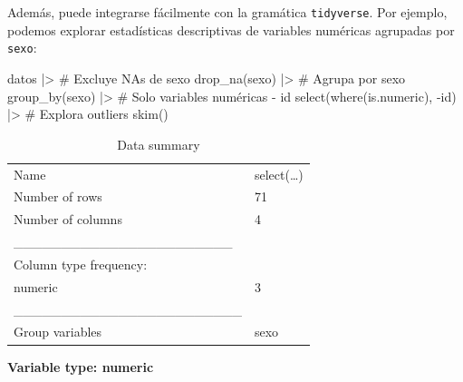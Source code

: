 \documentclass[
  spanish,
  letterpaper,
  DIV=11,
  numbers=noendperiod]{scrreprt}
\newenvironment{Shaded}{\begin{snugshade}}{\end{snugshade}}
\newcommand{\CommentTok}[1]{\textcolor[rgb]{0.37,0.37,0.37}{#1}}
\newcommand{\FunctionTok}[1]{\textcolor[rgb]{0.28,0.35,0.67}{#1}}
\newcommand{\NormalTok}[1]{\textcolor[rgb]{0.00,0.23,0.31}{#1}}
\newcommand{\SpecialCharTok}[1]{\textcolor[rgb]{0.37,0.37,0.37}{#1}}
\begin{document}
Además, puede integrarse fácilmente con la gramática \texttt{tidyverse}.
Por ejemplo, podemos explorar estadísticas descriptivas de variables
numéricas agrupadas por \texttt{sexo}:

\begin{Shaded}
\begin{Highlighting}[]
\NormalTok{datos }\SpecialCharTok{|\textgreater{}}
  \CommentTok{\# Excluye NAs de sexo}
  \FunctionTok{drop\_na}\NormalTok{(sexo) }\SpecialCharTok{|\textgreater{}}
  \CommentTok{\# Agrupa por sexo}
  \FunctionTok{group\_by}\NormalTok{(sexo) }\SpecialCharTok{|\textgreater{}}
  \CommentTok{\# Solo variables numéricas {-} id}
  \FunctionTok{select}\NormalTok{(}\FunctionTok{where}\NormalTok{(is.numeric), }\SpecialCharTok{{-}}\NormalTok{id) }\SpecialCharTok{|\textgreater{}}
  \CommentTok{\# Explora outliers}
  \FunctionTok{skim}\NormalTok{()}
\end{Highlighting}
\end{Shaded}

\begin{longtable}[]{@{}ll@{}}
\caption{Data summary}\tabularnewline
\toprule\noalign{}
\endfirsthead
\endhead
\bottomrule\noalign{}
\endlastfoot
Name & select(\ldots) \\
Number of rows & 71 \\
Number of columns & 4 \\
\_\_\_\_\_\_\_\_\_\_\_\_\_\_\_\_\_\_\_\_\_\_\_ & \\
Column type frequency: & \\
numeric & 3 \\
\_\_\_\_\_\_\_\_\_\_\_\_\_\_\_\_\_\_\_\_\_\_\_\_ & \\
Group variables & sexo \\
\end{longtable}

\textbf{Variable type: numeric}
\end{document}
